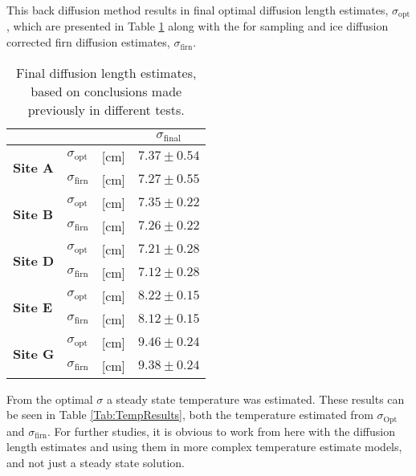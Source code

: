 \documentclass[../../CompleteThesis2/Complete_2ndDraft]{subfiles}
\begin{document}
This back diffusion method results in final optimal diffusion length estimates, $\sigma_{\text{opt}}$, which are presented in Table \ref{Tab:SigmaEstFinal2} along with the for sampling and ice diffusion corrected firn diffusion estimates, $\sigma_{\text{firn}}$.
\begin{table}[ht]
	\centering
	\begin{tabular}{l l l | c }
		& & & $\sigma_{\text{final}}$\\[0.15cm]
		\hline
		\hline 
		\multirow{2}{*}{\textbf{Site A}} & $\sigma_{\text{opt}}$ & [cm] & $7.37 \pm 0.54$ \\[0.1cm]
		& $\sigma_{\text{firn}}$ & [cm] & $7.27\pm 0.55$ \\[0.1cm]
		\hline
		
		\multirow{2}{*}{\textbf{Site B}} & $\sigma_{\text{opt}}$ & [cm] & $7.35 \pm 0.22$ \\[0.1cm]
		& $\sigma_{\text{firn}}$ & [cm] & $7.26\pm 0.22$\\[0.1cm]
		\hline
		
		\multirow{2}{*}{\textbf{Site D}} & $\sigma_{\text{opt}}$ & [cm] & $7.21 \pm 0.28$ \\[0.1cm]
		& $\sigma_{\text{firn}}$ & [cm] & $7.12 \pm 0.28$\\[0.1cm]
		\hline
		
		\multirow{2}{*}{\textbf{Site E}} & $\sigma_{\text{opt}}$ & [cm] & $ 8.22\pm 0.15$ \\[0.1cm]
		& $\sigma_{\text{firn}}$ & [cm] & $8.12 \pm 0.15$\\[0.1cm]
		\hline
		
		\multirow{2}{*}{\textbf{Site G}} & $\sigma_{\text{opt}}$ & [cm] & $9.46 \pm 0.24$ \\[0.1cm]
		& $\sigma_{\text{firn}}$ & [cm] & $9.38 \pm 0.24$\\[0.1cm]
		
		\hline
	\end{tabular}
	\caption[Final $\sigma$ Estimates]{\small Final diffusion length estimates, based on conclusions made previously in different tests.}
	\label{Tab:SigmaEstFinal2}
\end{table}

From the optimal $\sigma$ a steady state temperature was estimated. These results can be seen in Table \ref{Tab:TempResults}, both the temperature estimated from $\sigma_{\text{Opt}}$ and $\sigma_{\text{firn}}$. For further studies, it is obvious to work from here with the diffusion length estimates and using them in more complex temperature estimate models, and not just a steady state solution.
\end{document}
